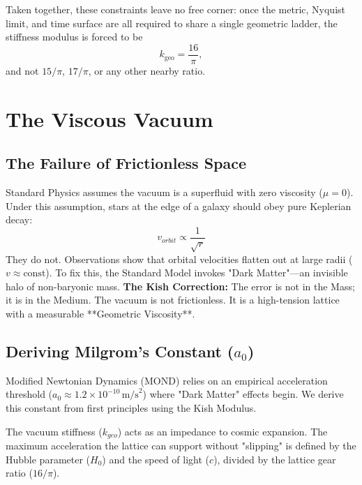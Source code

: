 \documentclass[11pt, letterpaper, openany]{book}
\begin{document}
Taken together, these constraints leave no free corner: once the metric, Nyquist limit,
and time surface are all required to share a single geometric ladder, the stiffness modulus
is forced to be
\begin{equation}
    k_{\text{geo}} = \frac{16}{\pi},
\end{equation}
and not $15/\pi$, $17/\pi$, or any other nearby ratio.



\chapter{The Viscous Vacuum}
\label{chap:viscous_vacuum}

\section{The Failure of Frictionless Space}
Standard Physics assumes the vacuum is a superfluid with zero viscosity ($ \mu = 0 $).
Under this assumption, stars at the edge of a galaxy should obey pure Keplerian decay:
\begin{equation}
    v_{orbit} \propto \frac{1}{\sqrt{r}}
\end{equation}
They do not. Observations show that orbital velocities flatten out at large radii ($ v \approx \text{const} $).
To fix this, the Standard Model invokes "Dark Matter"---an invisible halo of non-baryonic mass.
\textbf{The Kish Correction:} The error is not in the Mass; it is in the Medium.
The vacuum is not frictionless. It is a high-tension lattice with a measurable **Geometric Viscosity**.

\section{Deriving Milgrom's Constant ($a_0$)}
Modified Newtonian Dynamics (MOND) relies on an empirical acceleration threshold ($ a_0 \approx 1.2 \times 10^{-10} \, \text{m/s}^2 $) where "Dark Matter" effects begin.
We derive this constant from first principles using the Kish Modulus.

The vacuum stiffness ($ k_{geo} $) acts as an impedance to cosmic expansion. The maximum acceleration the lattice can support without "slipping" is defined by the Hubble parameter ($ H_0 $) and the speed of light ($ c $), divided by the lattice gear ratio ($ 16/\pi $).
\end{document}

